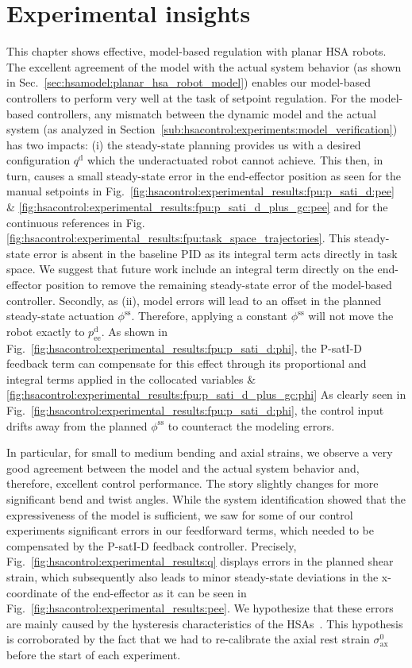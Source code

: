 \section{Experimental insights}
This chapter shows effective, model-based regulation with planar \gls{HSA} robots.
The excellent agreement of the model with the actual system behavior (as shown in Sec.~\ref{sec:hsamodel:planar_hsa_robot_model}) enables our model-based controllers to perform very well at the task of setpoint regulation.
For the model-based controllers, any mismatch between the dynamic model and the actual system (as analyzed in Section~\ref{sub:hsacontrol:experiments:model_verification}) has two impacts: (i) the steady-state planning provides us with a desired configuration $q^\mathrm{d}$ which the underactuated robot cannot achieve. This then, in turn, causes a small steady-state error in the end-effector position as seen for the manual setpoints in Fig.~\ref{fig:hsacontrol:experimental_results:fpu:p_sati_d:pee} \& \ref{fig:hsacontrol:experimental_results:fpu:p_sati_d_plus_gc:pee} 
and for the continuous references in Fig.\ref{fig:hsacontrol:experimental_results:fpu:task_space_trajectories}. This steady-state error is absent in the baseline PID as its integral term acts directly in task space. We suggest that future work include an integral term directly on the end-effector position to remove the remaining steady-state error of the model-based controller. Secondly, as (ii), model errors will lead to an offset in the planned steady-state actuation $\phi^\mathrm{ss}$. Therefore, applying a constant $\phi^\mathrm{ss}$ will not move the robot exactly to $p_\mathrm{ee}^\mathrm{d}$. As shown in Fig.~\ref{fig:hsacontrol:experimental_results:fpu:p_sati_d:phi}, the P-satI-D feedback term can compensate for this effect through its proportional and integral terms applied in the collocated variables \& \ref{fig:hsacontrol:experimental_results:fpu:p_sati_d_plus_gc:phi} 
As clearly seen in Fig.~\ref{fig:hsacontrol:experimental_results:fpu:p_sati_d:phi}, the control input drifts away from the planned $\phi^\mathrm{ss}$ to counteract the modeling errors.

In particular, for small to medium bending and axial strains, we observe a very good agreement between the model and the actual system behavior and, therefore, excellent control performance. 
The story slightly changes for more significant bend and twist angles. While the system identification showed that the expressiveness of the model is sufficient, we saw for some of our control experiments significant errors in our feedforward terms, which needed to be compensated by the P-satI-D feedback controller. Precisely, Fig.~\ref{fig:hsacontrol:experimental_results:q} displays errors in the planned shear strain, which subsequently also leads to minor steady-state deviations in the x-coordinate of the end-effector as it can be seen in Fig.~\ref{fig:hsacontrol:experimental_results:pee}. We hypothesize that these errors are mainly caused by the hysteresis characteristics of the \glspl{HSA}~\cite{good2022expanding}. This hypothesis is corroborated by the fact that we had to re-calibrate the axial rest strain $\sigma_\mathrm{ax}^0$ before the start of each experiment.